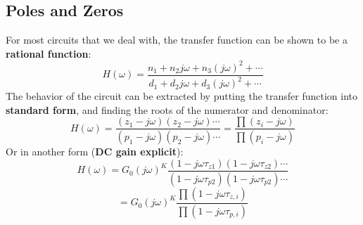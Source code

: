 \subsection{Poles and Zeros}
For most circuits that we deal with, the transfer function can be shown to be a \textbf{rational function}:
\begin{equation}
	H(\omega ) = \frac{{{n_1} + {n_2}j\omega  + {n_3}{{(j\omega )}^2} +  \cdots }}{{{d_1} + {d_2}j\omega  + {d_3}{{(j\omega )}^2} +  \cdots }}
\end{equation}
The behavior of the circuit can be extracted by putting the transfer function into \textbf{standard form}, and finding the roots of the numerator and denominator:
\begin{equation} 
	H(\omega ) = \frac{{({z_1} - j\omega )({z_2} - j\omega ) \cdots }}{{({p_1} - j\omega )({p_2} - j\omega ) \cdots }} = \frac{{\prod {({z_i} - j\omega )} }}{{\prod {({p_i} - j\omega )} }}
\end{equation}
Or in another form (\textbf{DC gain explicit}):
\begin{equation}
	H(\omega ) = {G_0}{(j\omega )^K}\frac{{(1 - j\omega {\tau _{z1}})(1 - j\omega {\tau _{z2}}) \cdots }}{{(1 - j\omega {\tau _{p2}})(1 - j\omega {\tau _{p2}}) \cdots }}
\end{equation}	
\begin{equation} = {G_0}{(j\omega )^K}\frac{{\prod {(1 - j\omega {\tau _{z,i}})} }}{{\prod {(1 - j\omega {\tau _{p,i}})} }}
\end{equation}
